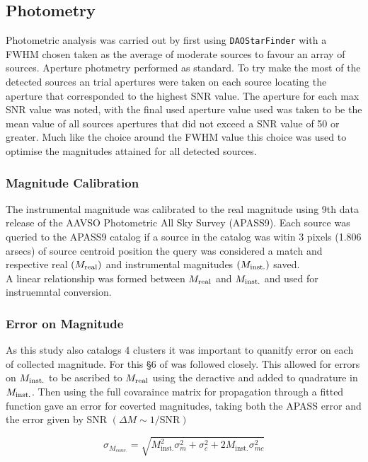\subsection{Photometry}
Photometric analysis was carried out by first using \verb|DAOStarFinder| with a FWHM chosen taken as the average of moderate sources to favour an array of sources. Aperture photmetry performed as standard. To try make the most of the detected sources an trial apertures were taken on each source locating the aperture that corresponded to the highest SNR value. The aperture for each max SNR value was noted, with the final used aperture value used was taken to be the mean value of all sources apertures that did not exceed a SNR value of 50 or greater. Much like the choice around the FWHM value this choice was used to optimise the magnitudes attained for all detected sources. 

\subsubsection{Magnitude Calibration}

The instrumental magnitude was calibrated to the real magnitude using 9th data release of the AAVSO Photometric All Sky Survey (APASS9). Each source was queried to the APASS9 catalog if a source in the catalog was witin 3 pixels (1.806 arsecs) of source centroid position the query was considered a match and respective real $(M_{\text{real}})$ and instrumental magnitudes $(M_{\text{inst.}})$ saved. \\ A linear relationship was formed between $M_{\text{real}}$ and $M_{\text{inst.}}$ and used for instruemntal conversion.

\subsubsection{Error on Magnitude}

As this study also catalogs 4 clusters it was important to quanitfy error on each of collected magnitude. For this §6 of \cite{bevington_d} was followed closely. This allowed for errors on $M_{\text{inst.}}$ to be ascribed to $M_{\text{real}}$ using the deractive and added to quadrature in $M_{\text{inst.}}$. Then using the full covaraince matrix for propagation through a fitted function gave an error for coverted magnitudes, taking both the APASS error and the error given by SNR $(\Delta M \sim 1/\text{SNR})$

\begin{equation}
  \sigma_{M_{conv.}} = \sqrt{M_{\text{inst.}}^2 \sigma^2_m + \sigma^2_c + 2 M_{\text{inst.}} \sigma^2_{mc}} 
\end{equation}

